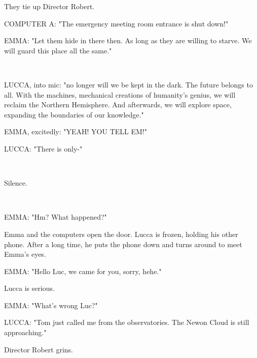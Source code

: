 \documentclass[11pt]{article}
\begin{document}
They tie up Director Robert.

COMPUTER A: "The emergency meeting room entrance is shut down!"

EMMA: "Let them hide in there then. 
As long as they are willing to starve.
We will guard this place all the same."

\ 

LUCCA, into mic: "no longer will we be kept in the dark.
The future belongs to all.
With the machines, mechanical creations of humanity's genius, we will reclaim the Northern Hemisphere.
And afterwards, we will explore space, expanding the boundaries of our knowledge."

EMMA, excitedly: "YEAH! YOU TELL EM!"

LUCCA: "There is only-"

\ 

Silence.

\ 

EMMA: "Hm? What happened?"

Emma and the computers open the door.
Lucca is frozen, holding his other phone.
After a long time, he puts the phone down and turns around to meet Emma's eyes.

EMMA: "Hello Luc, we came for you, sorry, hehe."

Lucca is serious.

EMMA: "What's wrong Luc?"

LUCCA: "Tom just called me from the observatories. 
The Newon Cloud is still approaching."

Director Robert grins.
\end{document}
